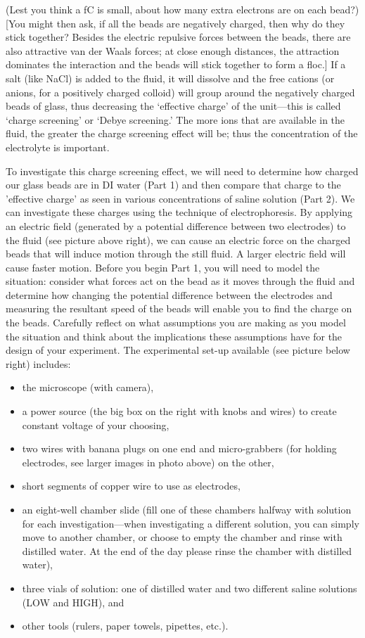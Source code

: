 (Lest you think a fC is small, about how many extra electrons are on each bead?) 
[You might then ask, if all the beads are negatively charged, then why do they stick together? 
Besides the electric repulsive forces between the beads, there are also attractive van der Waals forces; at close enough distances, the attraction dominates the interaction and the beads will stick together to form a floc.] 
If a salt (like NaCl) is added to the fluid, it will dissolve and the free cations (or anions, for a positively charged colloid) will group around the negatively charged beads of glass, thus decreasing the `effective charge' of the unit—this is called `charge screening' or `Debye screening.' 
The more ions that are available in the fluid, the greater the charge screening effect will be; thus the concentration of the electrolyte is important.
\par
To investigate this charge screening effect, we will need to determine how charged our glass beads are in DI water (Part 1) and then compare that charge to the 'effective charge' as seen in various concentrations of saline solution (Part 2). 
We can investigate these charges using the technique of electrophoresis. 
By applying an electric field (generated by a potential difference between two electrodes) to the fluid (see picture above right), we can cause an electric force on the charged beads that will induce motion through the still fluid.
A larger electric field will cause faster motion. 
Before you begin Part 1, you will need to model the situation: consider what forces act on the bead as it moves through the fluid and determine how changing the potential difference between the electrodes and measuring the resultant speed of the beads will enable you to find the charge on the beads. 
Carefully reflect on what assumptions you are making as you model the situation and think about the implications these assumptions have for the design of your experiment.
The experimental set-up available (see picture below right) includes:
\begin{itemize}
\item the microscope (with camera),
\item a power source (the big box on the right with knobs and wires) to create constant voltage of your choosing,
\item two wires with banana plugs on one end and micro-grabbers (for holding electrodes, see larger images in photo above) on the other,
\item short segments of copper wire to use as electrodes,
\item an eight-well chamber slide (fill one of these chambers halfway with solution for each investigation—when investigating a different solution, you can simply move to another chamber, or choose to empty the chamber and rinse with distilled water. At the end of the day please rinse the chamber with distilled water),
\item three vials of solution: one of distilled water and two different saline solutions (LOW and HIGH), and
\item other tools (rulers, paper towels, pipettes, etc.).
\end{itemize}
